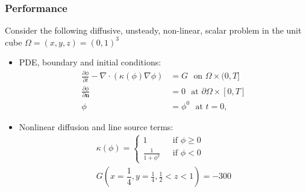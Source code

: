\documentclass{beamer}
\begin{document}
\newcommand{\onehalf}{\frac{1}{2}}
\newcommand{\pder}[2]{\ensuremath{\frac{\partial#1}{\partial#2}}}

\begin{frame}
  \frametitle{Performance}
  Consider the following diffusive, unsteady, non-linear, scalar
  problem in the unit cube $\Omega=(x,y,z)=(0,1)^3$
  \begin{itemize}
  \item PDE, boundary and initial conditions:
    \begin{equation}
      \begin{aligned}
        \pder{\phi}{t}-\nabla \cdot \left(\kappa(\phi)\nabla \phi \right) &= G
        ~~~\text{on $\Omega \times (0,T]$}\\
        \pder{\phi}{\mathbf{n}} &= 0 
        ~~~\text{at $\partial\Omega \times [0,T]$}\\
        \phi &= \phi^0
        ~~~\text{at $t=0$},
      \end{aligned}
    \end{equation}
  \item Nonlinear diffusion and line source terms:
    \begin{equation} 
      \begin{aligned}
        \kappa(\phi)=
        \begin{cases}
          1 ~~~&\text{if } \phi \ge 0 \\
          \frac{1}{1+\phi^2} ~~~&\text{if } \phi < 0
        \end{cases}\\
        G(x=\dfrac{1}{4},y=\frac{1}{4},\frac{1}{2}<z<1) = -300
      \end{aligned}
    \end{equation}
  \end{itemize}
\end{frame}
\end{document}

